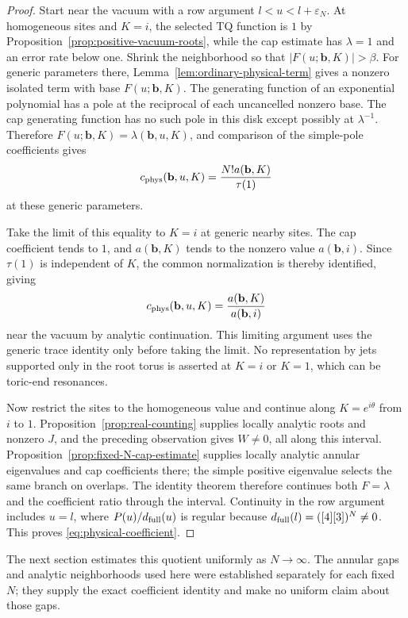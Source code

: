 \begin{proof}
Start near the vacuum with a row argument \(l<u<l+\varepsilon_N\). At homogeneous sites and \(K=i\), the selected TQ function is \(1\) by Proposition~\ref{prop:positive-vacuum-roots}, while the cap estimate has \(\lambda=1\) and an error rate below one. Shrink the neighborhood so that \(|F(u;\mathbf b,K)|>\beta\). For generic parameters there, Lemma~\ref{lem:ordinary-physical-term} gives a nonzero isolated term with base \(F(u;\mathbf b,K)\). The generating function of an exponential polynomial has a pole at the reciprocal of each uncancelled nonzero base. The cap generating function has no such pole in this disk except possibly at \(\lambda^{-1}\). Therefore \(F(u;\mathbf b,K)=\lambda(\mathbf b,u,K)\), and comparison of the simple-pole coefficients gives
\[
 c_{\rm phys}(\mathbf b,u,K)
 =\frac{N!a(\mathbf b,K)}{\tau(1)}
\]
at these generic parameters.

Take the limit of this equality to \(K=i\) at generic nearby sites. The cap coefficient tends to \(1\), and \(a(\mathbf b,K)\) tends to the nonzero value \(a(\mathbf b,i)\). Since \(\tau(1)\) is independent of \(K\), the common normalization is thereby identified, giving
\[
 c_{\rm phys}(\mathbf b,u,K)
 =\frac{a(\mathbf b,K)}{a(\mathbf b,i)}
\]
near the vacuum by analytic continuation. This limiting argument uses the generic trace identity only before taking the limit. No representation by jets supported only in the root torus is asserted at \(K=i\) or \(K=1\), which can be toric-end resonances.

Now restrict the sites to the homogeneous value and continue along \(K=e^{i\theta}\) from \(i\) to \(1\). Proposition~\ref{prop:real-counting} supplies locally analytic roots and nonzero \(J\), and the preceding observation gives \(W\ne0\), all along this interval. Proposition~\ref{prop:fixed-N-cap-estimate} supplies locally analytic annular eigenvalues and cap coefficients there; the simple positive eigenvalue selects the same branch on overlaps. The identity theorem therefore continues both \(F=\lambda\) and the coefficient ratio through the interval. Continuity in the row argument includes \(u=l\), where \(P(u)/d_{\rm full}(u)\) is regular because \(d_{\rm full}(l)=([4][3])^N\ne0\). This proves \eqref{eq:physical-coefficient}.
\end{proof}

The next section estimates this quotient uniformly as \(N\to\infty\). The annular gaps and analytic neighborhoods used here were established separately for each fixed \(N\); they supply the exact coefficient identity and make no uniform claim about those gaps.
